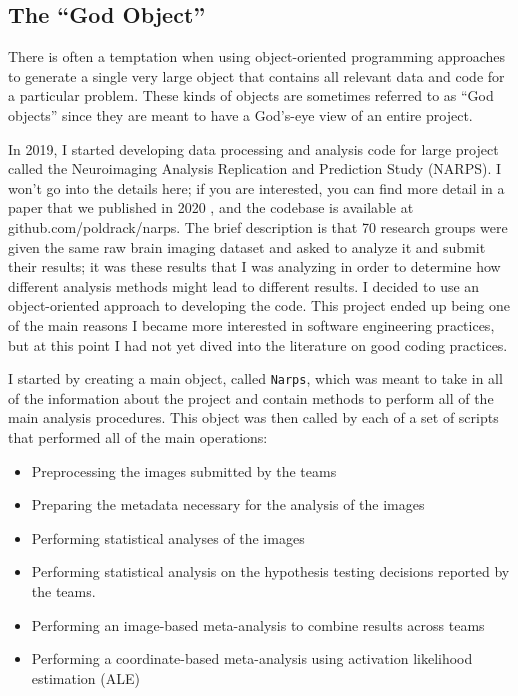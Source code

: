 \subsection{The ``God Object''}

There is often a temptation when using object-oriented programming approaches to generate a single very large object that contains all relevant data and code for a particular problem.
These kinds of objects are sometimes referred to as ``God objects'' since they are meant to have a God's-eye view of an entire project.

In 2019, I started developing data processing and analysis code for large project called the Neuroimaging Analysis Replication and Prediction Study (NARPS).
I won't go into the details here; if you are interested, you can find more detail in a paper that we published in 2020 \citep{Botvinik-Nezer:2020aa}, and the codebase is available at github.com/poldrack/narps.
The brief description is that 70 research groups were given the same raw brain imaging dataset and asked to analyze it and submit their results; it was these results that I was analyzing in order to determine how different analysis methods might lead to different results.
I decided to use an object-oriented approach to developing the code.
This project ended up being one of the main reasons I became more interested in software engineering practices, but at this point I had not yet dived into the literature on good coding practices.

I started by creating a main object, called \texttt{Narps}, which was meant to take in all of the information about the project and contain methods to perform all of the main analysis procedures.
This object was then called by each of a set of scripts that performed all of the main operations:

\begin{itemize}
\item Preprocessing the images submitted by the teams
\item Preparing the metadata necessary for the analysis of the images
\item Performing statistical analyses of the images
\item Performing statistical analysis on the hypothesis testing decisions reported by the teams.
\item Performing an image-based meta-analysis to combine results across teams
\item Performing a coordinate-based meta-analysis using activation likelihood estimation (ALE)
\end{itemize}

